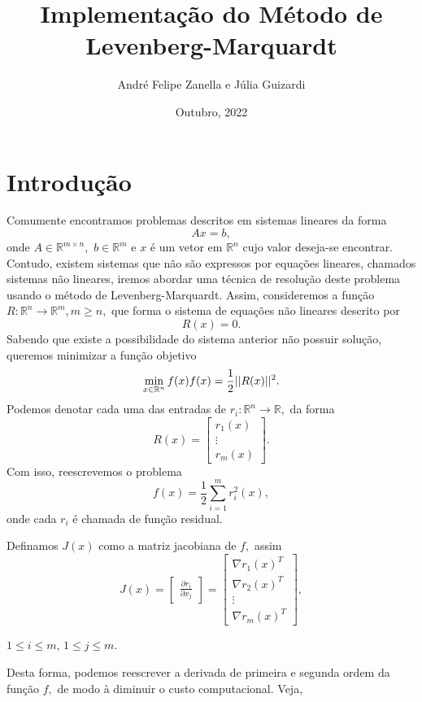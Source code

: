 \documentclass[12pt,a4paper]{article}
\author{André Felipe Zanella e Júlia Guizardi}
\title{Implementação do Método de Levenberg-Marquardt}
\date{Outubro, 2022}
\newcounter{ex}[section]
\begin{document}
	\maketitle
	\section{Introdução}\label{intro}
	Comumente encontramos problemas descritos em sistemas lineares da forma $$Ax = b,$$
	onde $A \in \mathbb{R}^{m\times n},$ $b \in \mathbb{R}^m$ e $x$ é um vetor em $\mathbb{R}^n$ cujo valor deseja-se encontrar.
	Contudo, existem sistemas que não são expressos por equações lineares, chamados sistemas não lineares, iremos abordar uma técnica de resolução deste problema usando o método de Levenberg-Marquardt. Assim, consideremos a função $R: \mathbb{R}^n \longrightarrow \mathbb{R}^m, m\geq n,$ que forma o sistema de equações não lineares descrito por $$R(x)=0.$$
	Sabendo que existe a possibilidade do sistema anterior não possuir solução, queremos minimizar a função objetivo
	\begin{equation}\label{qmnl}
	\min_{x \in \mathbb{R}^{n}} f(x) 
	\\	
	f(x) = \frac{1}{2}||R(x)||^2.
	\end{equation}
	Podemos denotar cada uma das entradas de $r_i:\mathbb{R}^n\longrightarrow \mathbb{R},$ da forma
	$$R(x)=\begin{bmatrix}
	r_1(x)\\ \vdots \\ r_m(x)
	\end{bmatrix}.$$ Com isso, reescrevemos o problema \begin{equation}
	f(x) = \frac{1}{2}\sum_{i=1}^{m}r_i^2(x),
	\end{equation}
	onde cada $r_i$ é chamada de função residual.
	
	Definamos $J(x)$ como a matriz jacobiana de $f,$ assim
	\[
	J (x) =
	\begin{bmatrix}
	\frac{\partial{r_i}}{\partial{x_j}}
	\end{bmatrix}
	=
	\begin{bmatrix}
	\nabla r_1(x)^{T} \\
	\nabla r_2(x)^{T} \\
	\vdots \\
	\nabla r_m(x)^{T}
	\end{bmatrix}
	,
	\]

	$1 \leq i \leq m$, $1 \leq j \leq m$.
		
	Desta forma, podemos reescrever a derivada de primeira e segunda ordem da função $f,$ de modo à diminuir o custo computacional. Veja,
	
\end{document}
